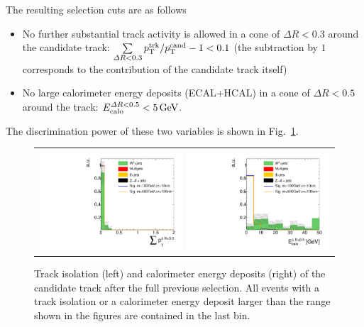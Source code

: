 The resulting selection cuts are as follows
\begin{itemize}
\renewcommand{\labelitemi}{\footnotesize{\ding{118}}}
\item No further substantial track activity is allowed in a cone of $\Delta R < 0.3$ around the candidate track: \mbox{$\sum \limits_{\Delta R < 0.3} p_{\text{T}}^{\text{trk}}/p_{\text{T}}^{\text{cand}} - 1 < 0.1$} (the subtraction by $1$ corresponds to the contribution of the candidate track itself)
\item No large calorimeter energy deposits (ECAL+HCAL) in a cone of $\Delta R < 0.5$ around the track: \mbox{$E^{\Delta R<0.5}_{\text{calo}}<5\,\text{Ge}\kern-0.06667em\text{V}$}.
\end{itemize}
The discrimination power of these two variables is shown in Fig.~\ref{fig:TrackIso_Ecalo_After_Preselection}.\\
\begin{figure}[!b]
  \centering 
  \begin{tabular}{c}
    \includegraphics[width=0.49\textwidth]{figures/analysis_2/AnalysisSelection/chiTracksCandidateSelectionTrigger_2Signals_FullBkg/htrackIsolation_lin.pdf}
    \includegraphics[width=0.49\textwidth]{figures/analysis_2/AnalysisSelection/chiTracksCandidateSelectionTrigger_2Signals_FullBkg/htrackCaloIsolation_lin.pdf}
  \end{tabular}
  \caption{Track isolation (left) and calorimeter energy deposits (right) of the candidate track after the full previous selection. 
           All events with a track isolation or a calorimeter energy deposit larger than the range shown in the figures are contained in the last bin.}
  \label{fig:TrackIso_Ecalo_After_Preselection}
\end{figure}

